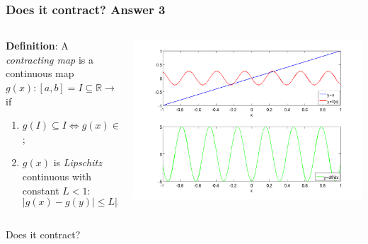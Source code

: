 \documentclass{beamer}
\begin{document}
\begin{frame}
\frametitle{Does it contract? Answer 3}

\begin{columns}
    \begin{column}{0.45\textwidth}
  {\bf Definition}: A \emph{contracting map} is a continuous map
  $g(x) : [a, b] = I \subseteq \mathbb{R} \rightarrow \mathbb{R}$ if
\begin{enumerate}
  \item $g(I) \subseteq I \Leftrightarrow g(x) \in I \, \, \, \forall
    x \in I$;
  \item $g(x)$ is \emph{Lipschitz} continuous with constant $L < 1$:
    \begin{equation*}
      | g(x) - g(y) | \leq L | x - y | \, \, \, \forall x, y \in I.
    \end{equation*}
  \end{enumerate}
\end{column}
\begin{column}{0.55\textwidth}
  \begin{center}
   \includegraphics[width=\textwidth]{figures/cmap5}
  \end{center}
\end{column}
\end{columns}
\begin{overlayarea}{\textwidth}{0.1\textheight}
Does it contract?  
\end{overlayarea}
\end{frame}
\end{document}
